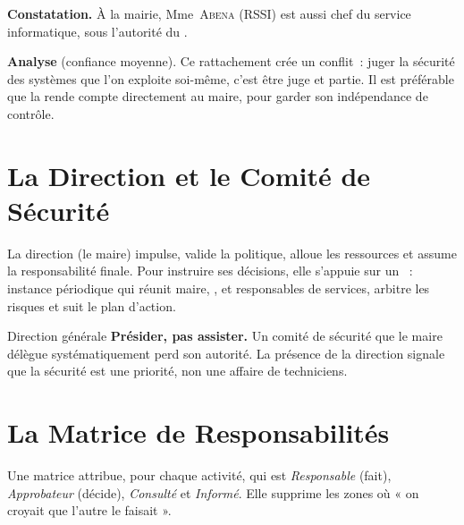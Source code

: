 \begin{boxprocedure}
\textbf{Constatation.} À la mairie, Mme~\textsc{Abena} (RSSI) est aussi chef du
service informatique, sous l'autorité du .

\medskip
\textbf{Analyse} (confiance moyenne). Ce rattachement crée un conflit~: juger
la sécurité des systèmes que l'on exploite soi-même, c'est être juge et
partie. Il est préférable que la  rende compte directement au
maire, pour garder son indépendance de contrôle.
\end{boxprocedure}

\section{La Direction et le Comité de Sécurité}
\label{sec:c04-comite}

La direction (le maire) impulse, valide la politique, alloue les ressources et
assume la responsabilité finale. Pour instruire ses décisions, elle s'appuie
sur un ~: instance périodique qui réunit maire,
,  et responsables de services, arbitre les risques et
suit le plan d'action.

\begin{boxmetier}{Direction générale}
\textbf{Présider, pas assister.} Un comité de sécurité que le maire délègue
systématiquement perd son autorité. La présence de la direction signale que la
sécurité est une priorité, non une affaire de techniciens.
\end{boxmetier}

\section{La Matrice de Responsabilités}
\label{sec:c04-raci}

\begin{boxdef}
Une matrice  attribue, pour chaque activité, qui est
\emph{Responsable} (fait), \emph{Approbateur} (décide), \emph{Consulté} et
\emph{Informé}. Elle supprime les zones où « on croyait que l'autre le
faisait ».
\end{boxdef}

